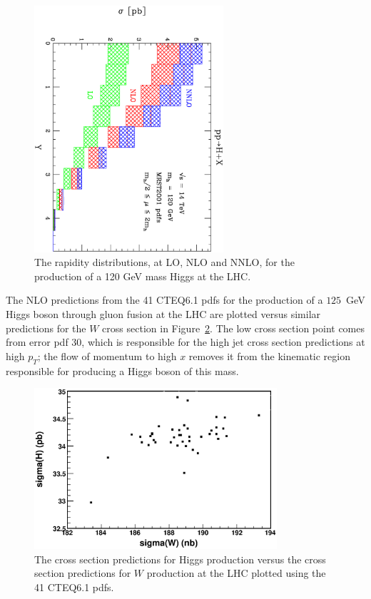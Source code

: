 \documentclass[12pt]{iopart}
\begin{document}
%
\begin{figure}[t]
\begin{center}    
\includegraphics[width=7cm,angle=90]{test.ps}    
\end{center}    
\caption{The rapidity distributions, at LO, NLO and NNLO,  for the production of a 120 GeV mass Higgs at the LHC.}
\label{fig:higgs_y}
\end{figure}
%


The NLO predictions from  the 41 CTEQ6.1 pdfs for the production of a $125$~GeV Higgs boson through gluon fusion at the LHC are
plotted versus similar predictions for the $W$ cross section in Figure~\ref{fig:Higgs_W_LHC}. 
The low cross section point
comes from error pdf 30, which is responsible for the high jet cross section predictions at high $p_T$; the flow
of momentum to high $x$ removes it from the kinematic region responsible for producing a Higgs boson of this mass. 

%
\begin{figure}[t]
\begin{center}
\includegraphics[width=9cm]{sigma_H_vs_sigma_W.eps}
\end{center}
\caption{
The cross section predictions for Higgs production versus the cross section predictions for $W$ production
at the LHC plotted using the 41 CTEQ6.1 pdfs. } 
\label{fig:Higgs_W_LHC}
\end{figure}
%
\end{document}
